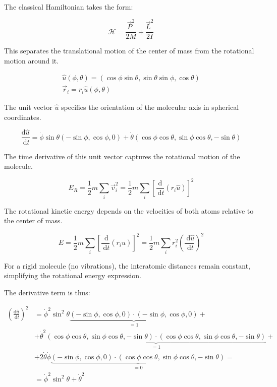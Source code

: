 \documentclass[italian]{HKNdocument}
\begin{document}
The classical Hamiltonian takes the form:

\begin{equation}
\mathcal{H}=\frac{\vec{P}^{2}}{2 M}+\frac{\vec{L}^{2}}{2 I} \label{eq:8.63}
\end{equation}

This separates the translational motion of the center of mass from the rotational motion around it.

\[
\begin{array}{r}
\hat{u}(\phi, \theta)=(\cos \phi \sin \theta, \sin \theta \sin \phi, \cos \theta)  \label{eq:8.64}\\
\vec{r}_{i}=r_{i} \hat{u}(\phi, \theta)
\end{array}
\]

The unit vector $\hat{u}$ specifies the orientation of the molecular axis in spherical coordinates.

\begin{equation}
\frac{\mathrm{d} \hat{u}}{\mathrm{~d} t}=\dot{\phi} \sin \theta(-\sin \phi, \cos \phi, 0)+\dot{\theta}(\cos \phi \cos \theta, \sin \phi \cos \theta,-\sin \theta) \label{eq:8.65}
\end{equation}

The time derivative of this unit vector captures the rotational motion of the molecule.

\begin{equation}
E_{R}=\frac{1}{2} m \sum_{i} \vec{v}_{i}^{2}=\frac{1}{2} m \sum_{i}\left[\frac{\mathrm{d}}{\mathrm{~d} t}\left(r_{i} \hat{u}\right)\right]^{2} \label{eq:8.66}
\end{equation}

The rotational kinetic energy depends on the velocities of both atoms relative to the center of mass.

\begin{equation}
E=\frac{1}{2} m \sum_{i}\left[\frac{\mathrm{~d}}{\mathrm{~d} t}\left(r_{i} \hat{u}\right)\right]^{2}=\frac{1}{2} m \sum_{i} r_{i}^{2}\left(\frac{\mathrm{~d} \hat{u}}{\mathrm{~d} t}\right)^{2} \label{eq:8.67}
\end{equation}

For a rigid molecule (no vibrations), the interatomic distances remain constant, simplifying the rotational energy expression.

The derivative term is thus:

\begin{align}
\left(\frac{\mathrm{d} \hat{u}}{\mathrm{~d} t}\right)^{2} & =\dot{\phi}^{2} \sin ^{2} \theta \underbrace{(-\sin \phi, \cos \phi, 0) \cdot(-\sin \phi, \cos \phi, 0)}_{=1}+ \\
& +\dot{\theta}^{2} \underbrace{(\cos \phi \cos \theta, \sin \phi \cos \theta,-\sin \theta) \cdot(\cos \phi \cos \theta, \sin \phi \cos \theta,-\sin \theta)}_{=1}+ \\
& +2 \dot{\theta} \dot{\phi} \underbrace{(-\sin \phi, \cos \phi, 0) \cdot(\cos \phi \cos \theta, \sin \phi \cos \theta,-\sin \theta)}_{=0}= \\
& =\dot{\phi}^{2} \sin ^{2} \theta+\dot{\theta}^{2} \label{eq:8.68}
\end{align}
\end{document}

